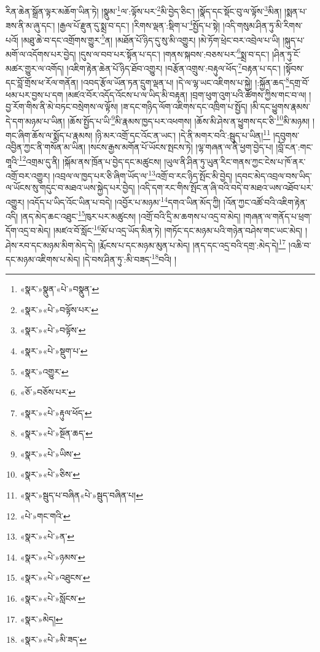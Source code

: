 རིན་ཆེན་སྒྲོན་ལྟར་མཆོག་ཡིན་ཏེ། །སྣུམ་\footnote{«སྣར་»སྣུན་«པེ་»བསྣུན་}ལ་:ལྟོས་པར་\footnote{«སྣར་»«པེ་»བལྟོས་པར་}མི་བྱེད་ཅིང་། །སྣོད་དང་སྡོང་བུ་ལ་ལྟོས་\footnote{«སྣར་»«པེ་»བལྟོས་}མིན། །སྨན་པ་ཟས་ནི་མ་ཞུ་དང་། །རྒྱལ་པོ་རྫུན་དུ་སྨྲ་བ་དང་། །རིགས་ལྡན་:སྡིག་པ་\footnote{«སྣར་»«པེ་»སྡུག་པ་}སྤྱོད་པ་སྟེ། །འདི་གསུམ་ཤིན་ཏུ་མི་རིགས་པའོ། །མཐུ་ཆེ་བ་དང་འགྲོགས་གྱུར་\footnote{«སྣར་»འགྱུར་}ན། །མཐོན་པོ་ཉིད་དུ་སུ་མི་འགྱུར། །མེ་ཏོག་ཕྲེང་བར་འབྲེལ་པ་ཡི། །སྐུད་པ་མགོ་ལ་འདོགས་པར་བྱེད། །དུས་ལ་བབ་པར་སྟོན་པ་དང་། །གནས་སྐབས་:བཅས་པར་\footnote{«ཅོ་»བཅོས་པར་}སྨྲ་བ་དང་། །ཤིན་ཏུ་ངོ་མཚར་གྱུར་ལ་འགོད། །འཇིག་རྟེན་ཆེན་པོ་ཉིད་ཐོབ་འགྱུར། །བརྩོན་འགྲུས་:བརྟུལ་ཕོད་\footnote{«སྣར་»«པེ་»རྟུལ་ཕོད་}བརྟན་པ་དང་། །སྟོབས་དང་བློ་གྲོས་ཕ་རོལ་གནོན། །འབད་རྩོལ་ཡོན་ཏན་དྲུག་ལྡན་པ། །དེ་ལ་ལྷ་ཡང་འཇིགས་པ་སྐྱེ། །:སྐྱོན་ཆད་\footnote{«སྣར་»«པེ་»སྔོན་ཆད་}དགྲ་བོ་ཕམ་པར་བྱས་པ་དག །མཛའ་བོར་འདོད་འོངས་པ་ལ་ཡིད་མི་བརྟན། །བྲག་ཕུག་འུག་པའི་ཚོགས་ཀྱིས་གང་བ་ལ། །བྱ་རོག་གིས་ནི་མེ་བཏང་བསྲེགས་ལ་ལྟོས། །ཟ་དང་གཉིད་ལོག་འཇིགས་དང་འཁྲིག་པ་སྤྱོད། །མི་དང་ཕྱུགས་རྣམས་དེ་དག་མཉམ་པ་ཡིན། །ཆོས་སྤྱོད་པ་ཡི་\footnote{«སྣར་»«པེ་»ཡིས་}མི་རྣམས་ཁྱད་པར་འཕགས། །ཆོས་མི་ཤེས་ན་ཕྱུགས་དང་ཅི་\footnote{«སྣར་»«པེ་»ཅིས་}མི་མཉམ། །གང་ཞིག་ཆོས་ལ་སྨོད་པ་རྣམས། །ཉི་མར་འགྲོ་དང་འོང་ན་ཡང་། །དེ་ནི་མགར་བའི་:སྦུད་པ་ཡིན།\footnote{«སྣར་»སྦུད་པ་བཞིན«པེ་»སྦུད་བཞིན་པ།} །དབུགས་འབྱིན་ཀྱང་ནི་གསོན་མ་ཡིན། །སངས་རྒྱས་མགོན་པོ་ཡོངས་སྤངས་ཏེ། །ལྷ་གཞན་ལ་ནི་ཕྱག་བྱེད་པ། །བློ་ངན་:གང་གཱའི་\footnote{«པེ་»གང་གའི་}འགྲམ་དུ་ནི། །སྐོམ་ནས་ཁྲོན་པ་བྱེད་དང་མཚུངས། །ཡུལ་ནི་ཤིན་ཏུ་ཡུན་རིང་གནས་ཀྱང་ངེས་པ་ཁོ་ནར་འགྲོ་བར་འགྱུར། །འབྲལ་ལ་ཁྱད་པར་ཅི་ཞིག་ཡོད་ལ་\footnote{«སྣར་»«པེ་»ན་}འགྲོ་བ་རང་ཉིད་སྤོང་མི་བྱེད། །དབང་མེད་འབྲལ་བས་ཡིད་ལ་ཡོངས་སུ་གདུང་བ་མཐའ་ཡས་སྐྱེད་པར་བྱེད། །འདི་དག་རང་གིས་སྤོང་ན་ཞི་བའི་བདེ་བ་མཐའ་ཡས་འཐོབ་པར་འགྱུར། །འདོད་པ་ཡིད་འོང་ཡིན་པ་བདེ། །འབྱོར་པ་མཉམ་\footnote{«སྣར་»«པེ་»ཉམས་}དགའ་ཡིན་མོད་ཀྱི། །འོན་ཀྱང་འཚོ་བའི་འཇིག་རྟེན་འདི། །ནད་མེད་ཆང་འཐུང་\footnote{«སྣར་»«པེ་»འཐུངས་}ཁུར་པར་མཚུངས། །འགྲོ་བའི་དྲི་མ་ཆགས་པ་འདྲ་བ་མེད། །གཞན་ལ་གནོད་པ་ཕྲག་དོག་འདྲ་བ་མེད། །མཛའ་བོ་སློང་\footnote{«སྣར་»«པེ་»སློངས་}མོ་པ་འདྲ་ཡོད་མིན་ཏེ། །གཏོང་དང་མཉམ་པའི་གཉེན་བཤེས་གང་ཡང་མེད། །ཤེས་རབ་དང་མཉམ་མིག་མེད་དེ། །རྨོངས་པ་དང་མཉམ་མུན་པ་མེད། །ནད་དང་འདྲ་བའི་དགྲ་:མེད་དེ།\footnote{«སྣར་»མེད།} །འཆི་བ་དང་མཉམ་འཇིགས་པ་མེད། །དེ་བས་ཤིན་ཏུ་:མི་བཟད་\footnote{«སྣར་»«པེ་»མི་ཟད་}བའི། །
